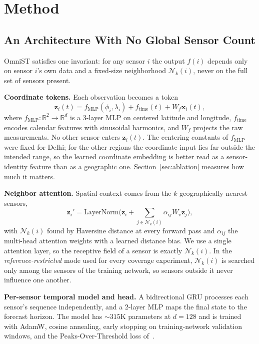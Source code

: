 \documentclass[journal,twoside,web]{ieeecolor}
\begin{document}
\section{Method}
\label{sec:architecture}

\subsection{An Architecture With No Global Sensor Count}

OmniST satisfies one invariant: for any sensor $i$ the output $f(i)$ depends only on sensor $i$'s own
data and a fixed-size neighborhood $\mathcal{N}_k(i)$, never on the full set of sensors present.

\textbf{Coordinate tokens.} Each observation becomes a token
\begin{equation}
\mathbf{z}_i(t) = f_{\text{MLP}}(\phi_i, \lambda_i) + f_{\text{time}}(t) + W_f \mathbf{x}_i(t),
\end{equation}
where $f_{\text{MLP}}:\mathbb{R}^2\to\mathbb{R}^d$ is a 3-layer MLP on centered latitude and longitude,
$f_{\text{time}}$ encodes calendar features with sinusoidal harmonics, and $W_f$ projects the raw
measurements. No other sensor enters $\mathbf{z}_i(t)$. The centering constants of
$f_{\text{MLP}}$ were fixed for Delhi; for the other regions the coordinate input lies far outside the
intended range, so the learned coordinate embedding is better read as a sensor-identity feature than
as a geographic one. Section~\ref{sec:ablation} measures how much it matters.

\textbf{Neighbor attention.} Spatial context comes from the $k$ geographically nearest sensors,
\begin{equation}
\mathbf{z}_i' = \text{LayerNorm}\Big(\mathbf{z}_i + \sum_{j \in \mathcal{N}_k(i)} \alpha_{ij} W_v \mathbf{z}_j\Big),
\end{equation}
with $\mathcal{N}_k(i)$ found by Haversine distance at every forward pass and $\alpha_{ij}$ the
multi-head attention weights with a learned distance bias. We use a single attention layer, so the
receptive field of a sensor is exactly $\mathcal{N}_k(i)$. In the \emph{reference-restricted} mode
used for every coverage experiment, $\mathcal{N}_k(i)$ is searched only among the sensors of the
training network, so sensors outside it never influence one another.

\textbf{Per-sensor temporal model and head.} A bidirectional GRU processes each sensor's sequence
independently, and a 2-layer MLP maps the final state to the forecast horizon. The model has
${\sim}315$K parameters at $d{=}128$ and is trained with AdamW, cosine annealing, early stopping on
training-network validation windows, and the Peaks-Over-Threshold loss of~\cite{panja2026estgcn}.
\end{document}
